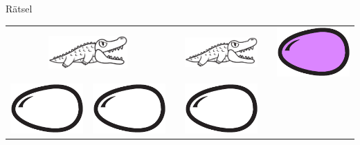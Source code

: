 \begin{frame}{Rätsel}
	\begin{center}
		\begin{tabular}{rccccl}
			\multicolumn{2}{c}{
				\includegraphics[height=1.25cm]{media/alligator_blank}
			}
			& &
			\includegraphics[height=1.25cm]{media/alligator_blank}
			& &
			\includegraphics[height=.75cm]{media/egg_pink}
			\\
			\includegraphics[height=.75cm]{media/egg_blank}
			&
			\includegraphics[height=.75cm]{media/egg_blank}
			& &
			\includegraphics[height=.75cm]{media/egg_blank}
		\end{tabular}
	\end{center}
\end{frame}
